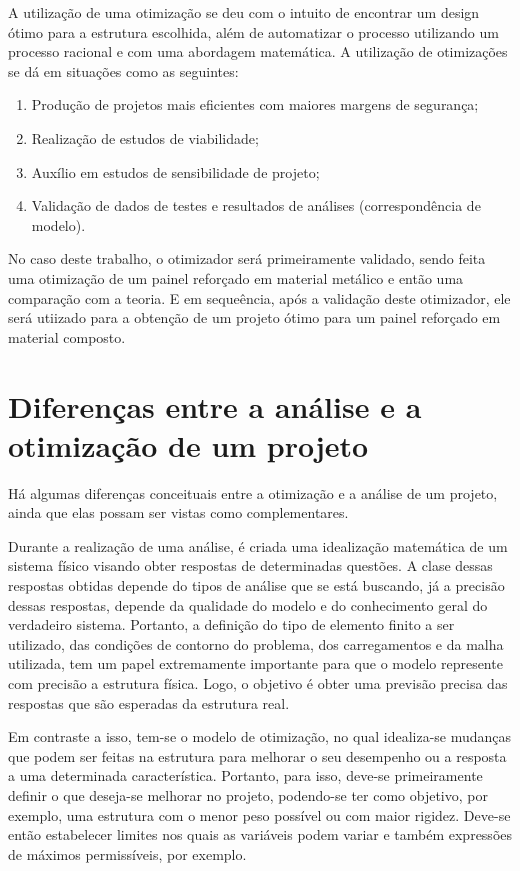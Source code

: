A utilização de uma otimização se deu com o intuito de encontrar um design ótimo para a estrutura escolhida, além de automatizar o processo utilizando um processo racional e com uma abordagem matemática. A utilização de otimizações se dá em situações como as seguintes:
\begin{enumerate}
  \item Produção de projetos mais eficientes com maiores margens de segurança;
  \item Realização de estudos de viabilidade;
  \item Auxílio em estudos de sensibilidade de projeto;
  \item Validação de dados de testes e resultados de análises (correspondência de modelo).
\end {enumerate}
No caso deste trabalho, o otimizador será primeiramente validado, sendo feita uma otimização de um painel reforçado em material metálico e então uma comparação com a teoria. E em sequeência, após a validação deste otimizador, ele será utiizado para a obtenção de um projeto ótimo para um painel reforçado em material composto.

\section{Diferenças entre a análise e a otimização de um projeto}
Há algumas diferenças conceituais entre a otimização e a análise de um projeto, ainda que elas possam ser vistas como complementares.

 Durante a realização de uma análise, é criada uma idealização matemática de um sistema físico visando obter respostas de determinadas questões. A clase dessas respostas obtidas depende do tipos de análise que se está buscando, já a precisão dessas respostas, depende da qualidade do modelo e do conhecimento geral do verdadeiro sistema. Portanto, a definição do tipo de elemento finito a ser utilizado, das condições de contorno do problema, dos carregamentos e da malha utilizada, tem um papel extremamente importante para que o modelo represente com precisão a estrutura física. Logo, o objetivo é obter uma previsão precisa das respostas que são esperadas da estrutura real.

 Em contraste a isso, tem-se o modelo de otimização, no qual idealiza-se mudanças que podem ser feitas na estrutura para melhorar o seu desempenho ou a resposta a uma determinada característica. Portanto, para isso, deve-se primeiramente definir o que deseja-se melhorar no projeto, podendo-se ter como objetivo, por exemplo, uma estrutura com o menor peso possível ou com maior rigidez. Deve-se então estabelecer limites nos quais as variáveis podem variar e também expressões de máximos permissíveis, por exemplo.

